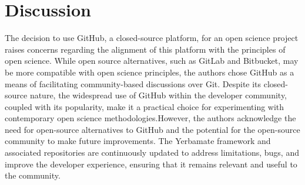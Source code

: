 \section{Discussion}

The decision to use GitHub, a closed-source platform, for an open science project raises concerns regarding the alignment of this platform with the principles of open science. While open source alternatives, such as GitLab and Bitbucket, may be more compatible with open science principles, the authors chose GitHub as a means of facilitating community-based discussions over Git. Despite its closed-source nature, the widespread use of GitHub within the developer community, coupled with its popularity, make it a practical choice for experimenting with contemporary open science methodologies.However, the authors acknowledge the need for open-source alternatives to GitHub and the potential for the open-source community to make future improvements. The Yerbamate framework and associated repositories are continuously updated to address limitations, bugs, and improve the developer experience, ensuring that it remains relevant and useful to the community.


